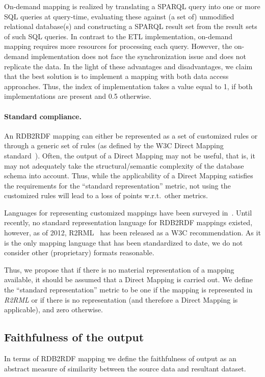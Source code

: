 On-demand mapping is realized by translating a SPARQL query into one or more SQL queries at query-time, evaluating these against (a set of) unmodified relational database(s) and constructing a SPARQL result set from the result sets of such SQL queries.
In contrast to the ETL implementation, on-demand mapping requires more resources for processing each query.
However, the on-demand implementation does not face the synchronization issue and does not replicate the data.  
In the light of these advantages and disadvantages, we claim that the best solution is to implement a mapping with both data access approaches.
Thus, the index of implementation takes a value equal to 1, if both implementations are present and 0.5 otherwise.


\paragraph{Standard compliance.}

An RDB2RDF mapping can either be represented as a set of customized rules or through a generic set of rules (as defined by the W3C Direct Mapping standard~\cite{direct_mapping, Bertails_2011}).
Often, the output of a Direct Mapping may not be useful, that is, it may not adequately take the structural/semantic complexity of the database schema into account.
Thus, while the applicability of a Direct Mapping satisfies the requirements for the “standard representation” metric, not using the customized rules will lead to a loss of points w.r.t.\ other metrics.

Languages for representing customized mappings have been surveyed in~\cite{spanos2012bringing}.
Until recently, no standard representation language for RDB2RDF mappings existed, however, as of 2012, R2RML~\cite{r2rml} has been released as a W3C recommendation.
As it is the only mapping language that has been standardized to date, we do not consider other (proprietary) formats reasonable.

Thus, we propose that if there is no material representation of a mapping available, it should be assumed that a Direct Mapping is carried out.
We define the “standard representation” metric to be one if the mapping is represented in \emph{R2RML} or if there is no representation (and therefore a Direct Mapping is applicable), and zero otherwise.
 
\subsection{Faithfulness of the output}
In terms of RDB2RDF mapping we define the faithfulness of output as an abstract measure of similarity between the source data and resultant dataset.

